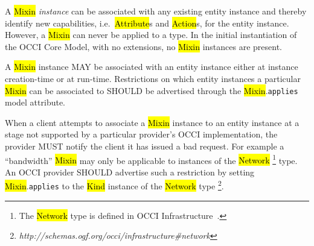 \documentclass[10pt,a4paper]{article}
\begin{document}
A \hl{Mixin} {\em instance} can be associated with any existing
entity instance and thereby identify new capabilities,
i.e.~\hl{Attribute}s and \hl{Action}s, for the entity instance.
However, a
\hl{Mixin} can never be applied to a type.  In the initial
instantiation of the OCCI Core Model, with no extensions, no
\hl{Mixin} instances are present.

A \hl{Mixin} instance MAY be associated with an entity instance
either at instance creation-time or at run-time.
Restrictions on which entity instances a particular \hl{Mixin} can be associated
to SHOULD be advertised through the \hl{Mixin}.{\tt applies} model attribute.

When a client attempts to associate a \hl{Mixin} instance to an entity instance
at a stage not supported by a particular provider's OCCI
implementation, the provider MUST notify the client it has issued a
bad request.
%
For example a ``bandwidth'' \hl{Mixin} may only
be applicable to instances of the \hl{Network}%
\footnote{The \hl{Network} type is defined in OCCI
  Infrastructure~\cite{occi:infrastructure}.}  type.
An OCCI provider SHOULD advertise such a restriction by setting
\hl{Mixin}.{\tt applies} to the \hl{Kind} instance of the \hl{Network} type%
\footnote{\textit{http://schemas.ogf.org/occi/infrastructure\#network}}.

\end{document}
